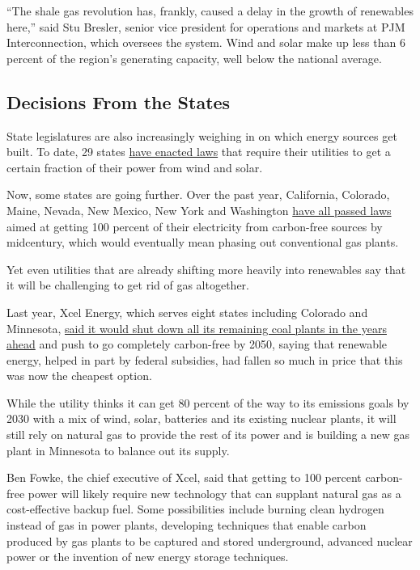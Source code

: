 ``The shale gas revolution has, frankly, caused a delay in the growth of
renewables here,'' said Stu Bresler, senior vice president for
operations and markets at PJM Interconnection, which oversees the
system. Wind and solar make up less than 6 percent of the region's
generating capacity, well below the national average.

\hypertarget{decisions-from-the-states}{%
\subsection{Decisions From the States}\label{decisions-from-the-states}}

State legislatures are also increasingly weighing in on which energy
sources get built. To date, 29 states
\href{http://www.ncsl.org/research/energy/renewable-portfolio-standards.aspx}{have
enacted laws} that require their utilities to get a certain fraction of
their power from wind and solar.

Now, some states are going further. Over the past year, California,
Colorado, Maine, Nevada, New Mexico, New York and Washington
\href{https://www.catf.us/wp-content/uploads/2019/05/State-and-Utility-Climate-Change-Targets.pdf}{have
all passed laws} aimed at getting 100 percent of their electricity from
carbon-free sources by midcentury, which would eventually mean phasing
out conventional gas plants.

Yet even utilities that are already shifting more heavily into
renewables say that it will be challenging to get rid of gas altogether.

Last year, Xcel Energy, which serves eight states including Colorado and
Minnesota,
\href{https://www.xcelenergy.com/environment/carbon_reduction_plan}{said
it would shut down all its remaining coal plants in the years ahead} and
push to go completely carbon-free by 2050, saying that renewable energy,
helped in part by federal subsidies, had fallen so much in price that
this was now the cheapest option.

While the utility thinks it can get 80 percent of the way to its
emissions goals by 2030 with a mix of wind, solar, batteries and its
existing nuclear plants, it will still rely on natural gas to provide
the rest of its power and is building a new gas plant in Minnesota to
balance out its supply.

Ben Fowke, the chief executive of Xcel, said that getting to 100 percent
carbon-free power will likely require new technology that can supplant
natural gas as a cost-effective backup fuel. Some possibilities include
burning clean hydrogen instead of gas in power plants, developing
techniques that enable carbon produced by gas plants to be captured and
stored underground, advanced nuclear power or the invention of new
energy storage techniques.

